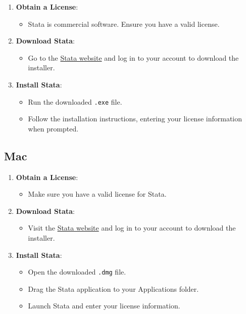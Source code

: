 \documentclass[
  letterpaper,
  DIV=11,
  numbers=noendperiod]{scrreprt}
\providecommand{\tightlist}{%
  \setlength{\itemsep}{0pt}\setlength{\parskip}{0pt}}\usepackage{longtable,booktabs,array}
\begin{document}
\begin{enumerate}
\def\labelenumi{\arabic{enumi}.}
\tightlist
\item
  \textbf{Obtain a License}:

  \begin{itemize}
  \tightlist
  \item
    Stata is commercial software. Ensure you have a valid license.
  \end{itemize}
\item
  \textbf{Download Stata}:

  \begin{itemize}
  \tightlist
  \item
    Go to the \href{https://www.stata.com/}{Stata website} and log in to
    your account to download the installer.
  \end{itemize}
\item
  \textbf{Install Stata}:

  \begin{itemize}
  \tightlist
  \item
    Run the downloaded \texttt{.exe} file.
  \item
    Follow the installation instructions, entering your license
    information when prompted.
  \end{itemize}
\end{enumerate}

\subsection{Mac}\label{mac-1}

\begin{enumerate}
\def\labelenumi{\arabic{enumi}.}
\tightlist
\item
  \textbf{Obtain a License}:

  \begin{itemize}
  \tightlist
  \item
    Make sure you have a valid license for Stata.
  \end{itemize}
\item
  \textbf{Download Stata}:

  \begin{itemize}
  \tightlist
  \item
    Visit the \href{https://www.stata.com/}{Stata website} and log in to
    your account to download the installer.
  \end{itemize}
\item
  \textbf{Install Stata}:

  \begin{itemize}
  \tightlist
  \item
    Open the downloaded \texttt{.dmg} file.
  \item
    Drag the Stata application to your Applications folder.
  \item
    Launch Stata and enter your license information.
  \end{itemize}
\end{enumerate}
\end{document}
